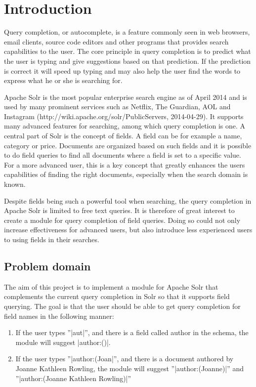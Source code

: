 \section{Introduction}
Query completion, or autocomplete, is a feature commonly seen in web browsers, email clients, source code editors and other programs that provides search capabilities to the user. The core principle in query completion is to predict what the user is typing and give suggestions based on that prediction. If the prediction is correct it will speed up typing and may also help the user find the words to express what he or she is searching for. 

Apache Solr is the most popular enterprise search engine as of April 2014\cite{ranking} and is used by many prominent services such as Netflix, The Guardian, AOL and Instagram (http://wiki.apache.org/solr/PublicServers, 2014-04-29). It supports many advanced features for searching, among which query completion is one. A central part of Solr is the concept of fields. A field can be for example a name, category or price. Documents are organized based on such fields and it is possible to do field queries to find all documents where a field is set to a specific value. For a more advanced user, this is a key concept that greatly enhances the users capabilities of finding the right documents, especially when the search domain is known. 

Despite fields being such a powerful tool when searching, the query completion in Apache Solr is limited to free text queries. It is therefore of great interest to create a module for query completion of field queries. Doing so could not only increase effectiveness for advanced users, but also introduce less experienced users to using fields in their searches.

\subsection{Problem domain}

The aim of this project is to implement a module for Apache Solr that complements the current query completion in Solr so that it supports field querying. The goal is that the user should be able to get query completion for field names in the following manner:

\begin{enumerate}
\item If the user types ''|aut|'', and there is a field called author in the schema, the module will suggest |author:()|. 
\item If the user types ''|author:(Joan|'', and there is a document authored by Joanne Kathleen Rowling, the module will suggest ''|author:(Joanne)|'' and ''|author:(Joanne Kathleen Rowling)|''
\end{enumerate}

